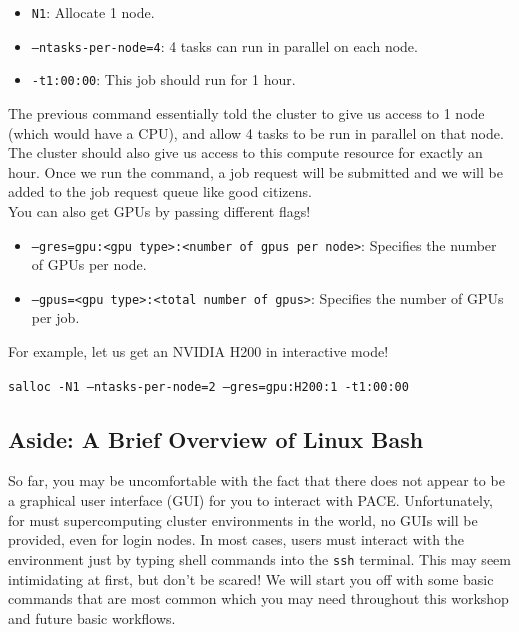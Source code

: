 \documentclass{article}
\begin{document}
\begin{itemize}
    \item \texttt{N1}: Allocate 1 node.
    \item \texttt{--ntasks-per-node=4}: 4 tasks can run in parallel on each node.
    \item \texttt{-t1:00:00}: This job should run for 1 hour. 
\end{itemize}

\noindent  The previous command essentially told the cluster to give us access to 1 node (which would have a CPU), and allow 4 tasks to be run in parallel on that node. The cluster should also give us access to this compute resource for exactly an hour. Once we run the command, a job request will be submitted and we will be added to the job request queue like good citizens. \\ 

\noindent You can also get GPUs by passing different flags!

\begin{itemize}
    \item \texttt{--gres=gpu:<gpu type>:<number of gpus per node>}: Specifies the number of GPUs per node.
    \item \texttt{--gpus=<gpu type>:<total number of gpus>}: Specifies the number of GPUs per job. 
\end{itemize}

\noindent For example, let us get an NVIDIA H200 in interactive mode!

\begin{center}
    \texttt{salloc -N1 --ntasks-per-node=2 --gres=gpu:H200:1 -t1:00:00}
\end{center}

\subsection{Aside: A Brief Overview of Linux Bash}

So far, you may be uncomfortable with the fact that there does not appear to be a graphical user interface (GUI) for you to interact with PACE. Unfortunately, for must supercomputing cluster environments in the world, no GUIs will be provided, even for login nodes. In most cases, users must interact with the environment just by typing shell commands into the \texttt{ssh} terminal. This may seem intimidating at first, but don't be scared! We will start you off with some basic commands that are most common which you may need throughout this workshop and future basic workflows. \\ 
\end{document}
